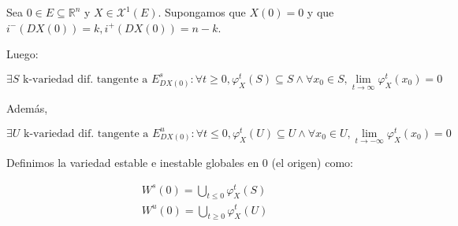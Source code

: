 \begin{defn}
	
\end{defn}


\begin{prop}
	
\end{prop}

\begin{thm}
	
\end{thm}

\begin{defn}
	
\end{defn}

\begin{thm}
	
\end{thm}

\begin{thm}
	Sea $0\in E\subseteq \mathbb{R}^n$ y $X\in \mathcal{X}^1(E)$. Supongamos que $X(0) = 0$ y que $i^-(DX(0)) = k,i^+(DX(0)) = n-k$. 
	
	Luego:
	
	\begin{equation*}
		\exists S \text{ k-variedad dif. tangente a } E^s_{DX(0)}: \forall t\geq 0, \varphi ^t_X(S) \subseteq S\land  \forall x_0 \in S, \lim_{t\to \infty} \varphi ^t_X(x_0) = 0 
	\end{equation*}
	
	Además,
	
	\begin{equation*}
		\exists U \text{ k-variedad dif. tangente a } E^u_{DX(0)}: \forall t\leq 0, \varphi ^t_X(U) \subseteq U\land  \forall x_0 \in U, \lim_{t\to -\infty} \varphi ^t_X(x_0) = 0 
	\end{equation*}
\end{thm}

\begin{defn}
	Definimos la variedad estable e inestable globales en $0$ (el origen) como:
	
	\begin{align*}
		W^s(0) = \bigcup_{t\leq 0} \varphi_X^t(S) \\
		W^u(0) = \bigcup_{t\geq 0} \varphi_X^t(U) \\
	\end{align*}
\end{defn}

